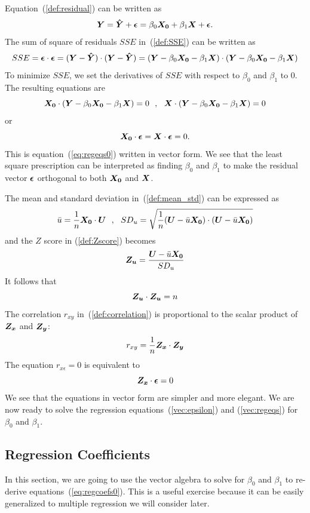\documentclass[11pt]{article}
\newcommand{\beq}{\begin{equation}}
\newcommand{\eeq}{\end{equation}}
\newcommand{\ve}[1]{\mbox{\boldmath $#1$}}
\begin{document}
Equation~(\ref{def:residual}) can be written as 
\beq
  \ve{Y} = \ve{\hat{Y}} + \ve{\epsilon} = \beta_0 \ve{X_0} + \beta_1 \ve{X} + \ve{\epsilon} .
\label{vec:epsilon}
\eeq
The sum of square of residuals $SSE$ in~(\ref{def:SSE}) can be written as 
\beq
  SSE = \ve{\epsilon} \cdot \ve{\epsilon} = (\ve{Y}-\ve{\hat{Y}})\cdot (\ve{Y}-\ve{\hat{Y}}) 
= (\ve{Y}-\beta_0 \ve{X_0}-\beta_1 \ve{X})\cdot (\ve{Y}-\beta_0 \ve{X_0}-\beta_1 \ve{X}) 
\label{vec:SSE}
\eeq
To minimize $SSE$, we set the derivatives of $SSE$ with respect to $\beta_0$ and $\beta_1$ 
to 0. The resulting equations are 
\[
  \ve{X_0} \cdot (\ve{Y}-\beta_0 \ve{X_0}-\beta_1 \ve{X})=0 \ \ , \ \ 
  \ve{X} \cdot (\ve{Y}-\beta_0 \ve{X_0}-\beta_1 \ve{X})=0 
\]
or 
\beq
  \ve{X_0} \cdot \ve{\epsilon} = \ve{X} \cdot \ve{\epsilon} = 0 .
\label{vec:regeqs}
\eeq
This is equation~(\ref{eq:regeqs0}) written in vector form.
We see that the least square prescription can be interpreted as finding 
$\beta_0$ and $\beta_1$ to make the residual vector $\ve{\epsilon}$ orthogonal 
to both $\ve{X_0}$ and $\ve{X}$.

The mean and standard deviation in~(\ref{def:mean_std}) can be expressed as 
\beq
  \bar{u} = \frac{1}{n}\ve{X_0}\cdot \ve{U} \ \ , \ \ 
SD_u = \sqrt{\frac{1}{n} (\ve{U}-\bar{u}\ve{X_0})\cdot (\ve{U}-\bar{u}\ve{X_0})} 
\label{vec:mean_std}
\eeq
and the $Z$ score in (\ref{def:Zscore}) becomes 
\beq
  \ve{Z_u} = \frac{\ve{U}-\bar{u} \ve{X_0}}{SD_u} 
\label{vec:Zscore}
\eeq
It follows that 
\beq
  \ve{Z_u} \cdot \ve{Z_u} = n 
\label{vec:Znorm}
\eeq
The correlation $r_{xy}$ in~(\ref{def:correlation}) is proportional to the scalar product of $\ve{Z_x}$ 
and $\ve{Z_y}$: 
\beq
  r_{xy} = \frac{1}{n} \ve{Z_x} \cdot \ve{Z_y} 
\label{vec:correlation}
\eeq 
The equation $r_{x\epsilon}=0$ is equivalent to 
\beq
  \ve{Z_x} \cdot \ve{\epsilon} = 0
\eeq
We see that the equations in vector form are simpler and more elegant. We are now 
ready to solve the regression equations~(\ref{vec:epsilon}) and (\ref{vec:regeqs}) 
for $\beta_0$ and $\beta_1$.

\subsection{Regression Coefficients} 
\label{sec:regcoefs}

In this section, we are going to use the vector algebra to solve for $\beta_0$ and $\beta_1$ 
to re-derive equations~(\ref{eq:regcoefs0}). This is a useful exercise because it can be 
easily generalized to multiple regression we will consider later.
\end{document}
